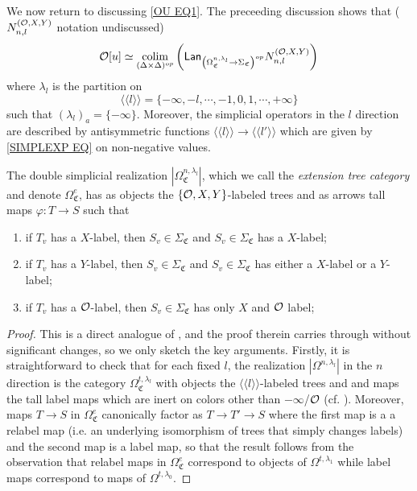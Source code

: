 \documentclass[a4paper,10pt
,draft
]{article}%
\renewcommand{\1}{\eta}%
\newcommand{\OC}{\Omega_{\mathfrak C}}
\begin{document}
We now return to discussing
\eqref{OU EQ1}.
The preceeding discussion shows that
({\color{blue} $N_{n,l}^{(\mathcal{O},X,Y)}$ notation undiscussed})
\begin{equation}\label{1STRED EQ}
\mathcal{O}[u] \simeq
\mathop{\operatorname{colim}}\limits_{(\Delta \times \Delta)^{op}}
\left(
	\mathsf{Lan}_{\left(\Omega_{\mathfrak C}^{n,\lambda_l} \to \Sigma_{\mathfrak C}\right)^{op}} N_{n,l}^{(\mathcal{O},X,Y)}
\right)
\end{equation}
where $\lambda_l$ is the partition on 
\[
\langle \langle l \rangle \rangle
=
\{-\infty,-l,\cdots,-1,0,1,\cdots,+\infty\}
\]
such that $\left(\lambda_l\right)_a = \{-\infty\}$.
Moreover, the simplicial operators in the $l$ direction are described by antisymmetric functions $\langle \langle l \rangle \rangle
 \to \langle \langle l' \rangle \rangle
$
which are given by \eqref{SIMPLEXP EQ} on non-negative values.


\begin{proposition}\label{EXTENTREE PROP}
The double simplicial realization
$|\Omega_{\mathfrak C}^{n,\lambda_l}|$,
which we call the \textit{extension tree category}
and denote
$\OC^e$, has as objects the 
$\{\mathcal{O},X,Y\}$-labeled trees
and as arrows tall maps $\varphi \colon T \to S$ such that
\begin{enumerate}[label=(\roman*)]
\item if $T_v$ has a $X$-label, then 
$S_v \in \Sigma_{\mathfrak{C}}$ and
$S_v \in \Sigma_{\mathfrak{C}}$ has a $X$-label;
\item if $T_v$ has a $Y$-label, then 
$S_v \in \Sigma_{\mathfrak{C}}$ and
$S_v \in \Sigma_{\mathfrak{C}}$ has either a $X$-label or a $Y$-label;
\item if $T_v$ has a $\mathcal{O}$-label, then 
$S_v \in \Sigma_{\mathfrak{C}}$ has only $X$ and $\mathcal{O}$ label;
\end{enumerate}
\end{proposition}


\begin{proof}
This is a direct analogue of \cite[Prop. 5.41]{BP_geo}, and the proof therein carries through without significant changes, so we only sketch the key arguments.
Firstly, it is straightforward to check that for each fixed $l$,
the realization $|\Omega^{n,\lambda_l}|$
in the $n$ direction is the category 
$\Omega^{t,\lambda_l}_{\mathfrak{C}}$
with objects the $\langle \langle l \rangle \rangle$-labeled trees and and maps the tall label maps which are inert on colors other than $-\infty$/$\mathcal{O}$ (cf. \cite[Rem. 5.36]{BP_geo}).
Moreover, maps 
$T \to S$
in 
$\Omega^e_{\mathfrak{C}}$
canonically factor 
as
$T \to T' \to S$
where the first map is a a relabel map (i.e. an underlying isomorphism of trees that simply changes labels) and the second map is a label map, 
so that the result follows from the observation that relabel maps in 
$\Omega^e_{\mathfrak{C}}$
correspond to objects of  
$\Omega^{t,\lambda_1}$
while label maps correspond to maps of
$\Omega^{t,\lambda_0}$.
\end{proof}
\end{document}
